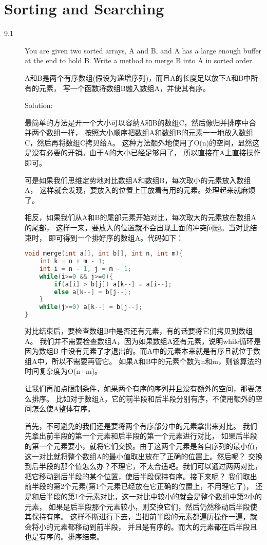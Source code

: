 \chapter{Sorting and Searching}
\small{} 

\begin{description}
\item[9.1] You are given two sorted arrays, A and B, and A has a large enough buffer at the end to hold B. Write a method to merge B into A in sorted order.

A和B是两个有序数组(假设为递增序列)，而且A的长度足以放下A和B中所有的元素， 写一个函数将数组B融入数组A，并使其有序。

Solution: 

最简单的方法是开一个大小可以容纳A和B的数组C，然后像归并排序中合并两个数组一样， 按照大小顺序把数组A和数组B的元素一一地放入数组C，然后再将数组C拷贝给A。 这种方法额外地使用了O(n)的空间，显然这是没有必要的开销。由于A的大小已经足够用了， 所以直接在A上直接操作即可。

可是如果我们思维定势地对比数组A和数组B，每次取小的元素放入数组A， 这样就会发现，要放入的位置上正放着有用的元素。处理起来就麻烦了。

相反，如果我们从A和B的尾部元素开始对比，每次取大的元素放在数组A的尾部， 这样一来，要放入的位置就不会出现上面的冲突问题。当对比结束时， 即可得到一个排好序的数组A。代码如下：
\begin{lstlisting}[language=C++]
void merge(int a[], int b[], int n, int m){
    int k = n + m - 1;
    int i = n - 1, j = m - 1;
    while(i>=0 && j>=0){
        if(a[i] > b[j]) a[k--] = a[i--];
        else a[k--] = b[j--];
    }
    while(j>=0) a[k--] = b[j--];
}
\end{lstlisting}
对比结束后，要检查数组B中是否还有元素，有的话要将它们拷贝到数组A。 我们并不需要检查数组A，因为如果数组A还有元素，说明while循环是因为数组B 中没有元素了才退出的。而A中的元素本来就是有序且就位于数组A中，所以不需要再管它。 如果A和B中的元素个数为n和m，则该算法的时间复杂度为O(n+m)。

让我们再加点限制条件，如果两个有序的序列并且没有额外的空间，那要怎么排序。 比如对于数组A，它的前半段和后半段分别有序，不使用额外的空间怎么使A整体有序。

首先，不可避免的我们还是要将两个有序部分中的元素拿出来对比。 我们先拿出前半段的第一个元素和后半段的第一个元素进行对比， 如果后半段的第一个元素要小，就将它们交换。由于这两个元素是各自序列的最小值， 这一对比就将整个数组A的最小值取出放在了正确的位置上。然后呢？ 交换到后半段的那个值怎么办？不理它，不太合适吧。我们可以通过两两对比， 把它移动到后半段的某个位置，使后半段保持有序。接下来呢？ 我们取出前半段的第2个元素(第1个元素已经放在它正确的位置上，不用理它了)， 还是和后半段的第1个元素对比，这一对比中较小的就会是整个数组中第2小的元素， 如果是后半段那个元素较小，则交换它们，然后仍然移动后半段使其保持有序。 这样不断进行下去，当把前半段的元素都遍历操作一遍，就会将小的元素都移动到前半段， 并且是有序的。而大的元素都在后半段且也是有序的。排序结束。


\end{description}
